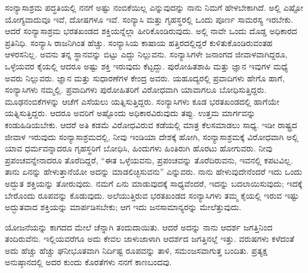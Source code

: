 ಸಂನ್ಯಾಸಾಶ್ರಮ ಪದ್ಧತಿಯಲ್ಲಿ ನನಗೆ ಅಷ್ಟು ನಂಬಿಕೆಯಿಲ್ಲ ಎನ್ನುವುದನ್ನು ನಾನು ನಿಮಗೆ ಹೇಳಬೇಕಾಗಿದೆ. ಅಲ್ಲಿ ಎಷ್ಟೋ ಯೋಗ್ಯವಾದುವೂ ಇವೆ, ದೋಷಗಳೂ ಇವೆ. ಸಂನ್ಯಾಸಿ ಮತ್ತು ಗೃಹಸ್ಥರಲ್ಲಿ ಒಂದು ಪೂರ್ಣ ಸಾಮರಸ್ಯ ಇರಬೇಕು. ಆದರೆ ಸಂನ್ಯಾಸಾಶ್ರಮ ಭರತಖಂಡದ ಶಕ್ತಿಯನ್ನೆಲ್ಲಾ ಹೀರಿಕೊಂಡಿರುವುದು. ಅಲ್ಲಿ ನಾವೇ ಒಂದು ದೊಡ್ಡ ಅಧಿಕಾರದ ಪ್ರತಿನಿಧಿ. ಸಂನ್ಯಾಸಿ ರಾಜನಿಗಿಂತ ಹೆಚ್ಚು. ಸಂನ್ಯಾಸಿಯ ಕಾಷಾಯ ಹತ್ತಿರದಲ್ಲಿದ್ದರೆ ಕುಳಿತುಕೊಂಡಿರುವಂತಹ ಆಳರಸನಿಲ್ಲ. ಅವನು ತನ್ನ ಸ್ಥಾನವನ್ನು ಬಿಟ್ಟು ಎದ್ದು ನಿಲ್ಲುವನು. ಸಂನ್ಯಾಸಿಗಳೇ ಜನಾಂಗದ ಜೀವಾಳವಾಗಿದ್ದರೂ, ಒಳ್ಳೆಯವರ ಕೈಯಲ್ಲಿ ಆದರೂ ಅಷ್ಟು ಶಕ್ತಿ ಇರುವುದು ಕೆಟ್ಟದ್ದು. ಪುರೋಹಿತಶಾಹಿ ಮತ್ತು ಜ್ಞಾನ ಇವುಗಳ ಮಧ್ಯೆ ಅವರು ನಿಲ್ಲುವರು. ಜ್ಞಾನ ಮತ್ತು ಸುಧಾರಣೆಗಳ ಕೇಂದ್ರ ಅವರು. ಯಹೂದ್ಯರಲ್ಲಿ ಪ್ರವಾದಿಗಳು ಹೇಗೊ ಹಾಗೆ, ಸಂನ್ಯಾಸಿಗಳು ನಮ್ಮಲ್ಲಿ. ಪ್ರವಾದಿಗಳು ಪುರೋಹಿತರಿಗೆ ವಿರೋಧವಾಗಿ ಯಾವಾಗಲೂ ಬೋಧಿಸುತ್ತಿದ್ದರು. ಮೂಢನಂಬಿಕೆಗಳನ್ನು ಆಚೆಗೆ ಎಸೆಯಲು ಯತ್ನಿಸುತ್ತಿದ್ದರು. ಸಂನ್ಯಾಸಿಗಳು ಕೂಡ ಭರತಖಂಡದಲ್ಲಿ ಹಾಗೆಯೇ ಯತ್ನಿಸುತ್ತಿದ್ದರು. ಆದರೂ ಅವರಿಗೆ ಅಷ್ಟೊಂದು ಅಧಿಕಾರವಿರುವುದು ತಪ್ಪು. ಉತ್ತಮ ಮಾರ್ಗವನ್ನು ಕಂಡುಹಿಡಿಯಬೇಕು. ಆದರೆ ಅತಿ ಕಡಮೆ ವಿರೋಧವಿರುವ ಕಡೆಯಲ್ಲಿ ಮಾತ್ರ ಕೆಲಸಮಾಡಲು ಸಾಧ್ಯ. ಇಡೀ ರಾಷ್ಟ್ರದ ಜೀವಾಳ ಇರುವುದು ಸಂನ್ಯಾಸಾಶ್ರಮದಲ್ಲಿ, ನೀವು ಇಂಡಿಯಾ ದೇಶಕ್ಕೆ ಹೋಗಿ, ಸಂನ್ಯಾಸಾಶ್ರಮಕ್ಕೆ ವಿರೋಧವಾಗಿ ಅಲ್ಲಿ ಯಾವ ಧರ್ಮವನ್ನಾದರೂ ಗೃಹಸ್ಥರಿಗೆ ಬೋಧಿಸಿ, ಹಿಂದುಗಳು ಹಿಂತಿರುಗಿ ಹೊರಟು ಹೋಗುವರು. ನೀವು ಪ್ರಪಂಚವನ್ನೇನಾದರೂ ತೊರೆದಿದ್ದರೆ, “ಈತ ಒಳ್ಳೆಯವನು, ಪ್ರಪಂಚವನ್ನು ತೊರೆದಿರುವನು, ಇವನಲ್ಲಿ ಕಪಟವಿಲ್ಲ. ತಾನು ಏನನ್ನು ಹೇಳುತ್ತಾನೆಯೋ ಅದನ್ನು ಮಾಡಲಿಚ್ಛಿಸುವನು” ಎನ್ನುವರು. ನಾನು ಹೇಳುವುದೇನೆಂದರೆ ಇದು ಒಂದು ಅದ್ಭುತ ಶಕ್ತಿಯನ್ನು ತೋರುವುದು. ನಮಗೆ ಏನು ಮಾಡುವುದಕ್ಕೆ ಸಾಧ್ಯವೆಂದರೆ, ಇದನ್ನು ಬದಲಾಯಿಸುವುದು; ಇದಕ್ಕೆ ಬೇರೊಂದು ರೂಪವನ್ನು ಕೊಡುವುದು. ಅಲೆಯುತ್ತಿರುವ ಭರತಖಂಡದ ಸಂನ್ಯಾಸಿಗಳು ತಮ್ಮ ಕೈಯಲ್ಲಿ ಇರುವ ಇಷ್ಟು ಅದ್ಭುತವಾದ ಶಕ್ತಿಯನ್ನು ಮಾರ್ಪಡಿಸಬೇಕು; ಆಗ ಇದು ಜನಸಾಮಾನ್ಯರನ್ನು ಮೇಲೆತ್ತುವುದು.

ಯೋಜನೆಯನ್ನು ಕಾಗದದ ಮೇಲೆ ಚೆನ್ನಾಗಿ ತಂದುದಾಯಿತು. ಆದರೆ ಅದನ್ನು ನಾನು ಆದರ್ಶ ಜಗತ್ತಿನಿಂದ ತಂದಿರುವೆನು. ಇಲ್ಲಿಯವರೆಗೂ ಅದು ಕೇವಲ ಜಾಳುಜಾಳಾಗಿ ಆದರ್ಶದ ಜಗತ್ತಿನಲ್ಲೆ ಇತ್ತು. ವರುಷಗಳು ಕಳೆದಂತೆ ಅದು ಹೆಚ್ಚು ಹೆಚ್ಚು ಘನೀಭೂತವಾಗಿ ನಿರ್ದಿಷ್ಟ ರೂಪವನ್ನು ತಾಳಿ, ಸಮಂಜಸವಾಗುತ್ತ ಬಂದಿತು. ಪ್ರತ್ಯಕ್ಷ ಅನುಷ್ಠಾನದಲ್ಲಿ ಅದರ ಕುಂದು ಕೊರತೆಗಳು ನನಗೆ ಕಾಣಬಂದವು.

